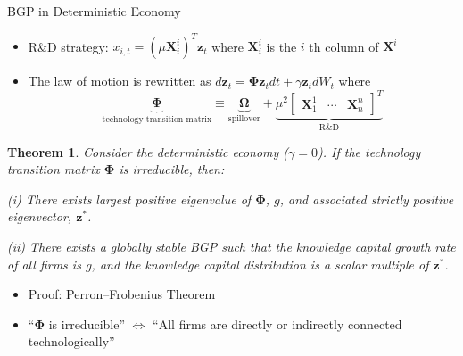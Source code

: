 \documentclass[english,aspectratio=169,handout]{beamer}
\providecommand{\theoremname}{Theorem}
\theoremstyle{plain}
\newtheorem*{thm*}{\protect\theoremname}
\newcommand{\mat}[1]{\bm{#1}}
\begin{document}
%
\begin{frame}{BGP in Deterministic Economy}
  \begin{itemize}
    \item R\&D strategy: $x_{i,t}=\left(\mu \mat{X}_{i}^{i}\right)^{T}\mathbf{z}_{t}$
          where $\mat{X}_{i}^{i}$ is the $i$ th column of $\mat{X}^{i}$
    \item The law of motion is rewritten as $d\mathbf{z}_{t}=\mat{\Phi}\mathbf{z}_{t}dt+\gamma\mathbf{z}_{t}dW_{t}$
          where
          \[
            \underbrace{\mat{\Phi}}_{\text{technology transition matrix}}\equiv\underbrace{\mat{\Omega}}_{\text{spillover}}+\underbrace{\mu^{2}\left[\begin{array}{ccc}
              \mat{X}_{1}^{1} & \cdots & \mat{X}_{n}^{n}\end{array}\right]^{T}}_{\text{R\&D}}
          \]
          \vspace{-5mm}
  \end{itemize}
  \begin{thm*}
    Consider the deterministic economy ($\gamma=0$). If the technology
    transition matrix $\mat{\Phi}$ is irreducible, then:

    (i) There exists largest positive eigenvalue of $\mat{\Phi}$, $g$, and
    associated strictly positive eigenvector, $\mathbf{z}^{*}$.

    (ii) There exists a globally stable BGP such that the knowledge capital
    growth rate of all firms is $g$, and the knowledge capital distribution
    is a scalar multiple of $\mathbf{z}^{*}$.
  \end{thm*}
  \begin{itemize}
    \item Proof: Perron--Frobenius Theorem
    \item ``$\mat{\Phi}$ is irreducible'' $\Longleftrightarrow$ ``All firms are
          directly or indirectly connected technologically''
  \end{itemize}
\end{frame}
%
\end{document}

